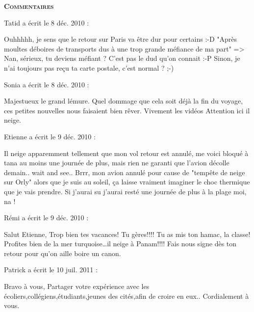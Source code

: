 \bigskip
\textbf{\textsc{Commentaires}}

\medskip
Tatid a écrit le 8 déc. 2010 :
\begin{displayquote}
Ouhhhhh, je sens que le retour sur Paris va être dur pour certains :-D
"Après moultes déboires de transports dus à une trop grande méfiance de ma part" => Nan, sérieux, tu deviens méfiant ? C'est pas le dud qu'on connait :-P
Sinon, je n'ai toujours pas reçu ta carte postale, c'est normal ? ;-)
\end{displayquote}

\medskip
Sonia a écrit le 8 déc. 2010 :
\begin{displayquote}
Majestueux le grand lémure.
Quel dommage que cela soit déjà la fin du voyage, ces petites nouvelles nous faisaient bien rêver.
Vivement les vidéos
Attention ici il neige.
\end{displayquote}

\medskip
Etienne a écrit le 9 déc. 2010 :
\begin{displayquote}
Il neige apparemment tellement que mon vol retour est annulé, me voici bloqué à tana au moins une journée de plus, mais rien ne garanti que l'avion décolle demain.. wait and see..
Brrr, mon avion annulé pour cause de "tempête de neige sur Orly" alors que je suis au soleil, ça laisse vraiment imaginer le choc thermique que je vais prendre. Si j'aurai su j'aurai resté une journée de plus à la plage moi, na !
\end{displayquote}

\medskip
Rémi a écrit le 9 déc. 2010 :
\begin{displayquote}
Salut Etienne,
Trop bien tes vacances!
Tu gères!!!! Tu as mis ton hamac, la classe!
Profites bien de la mer turquoise\dots il neige à Panam!!!!
Fais nous signe dès ton retour pour qu'on aille boire un canon.
\end{displayquote}

\medskip
Patrick a écrit le 10 juil. 2011 :
\begin{displayquote}
Bravo à vous,
Partager votre expérience avec les écoliers,collégiens,étudiants,jeunes des cités,afin de croire en eux..
Cordialement à vous.
\end{displayquote}

\vfill
